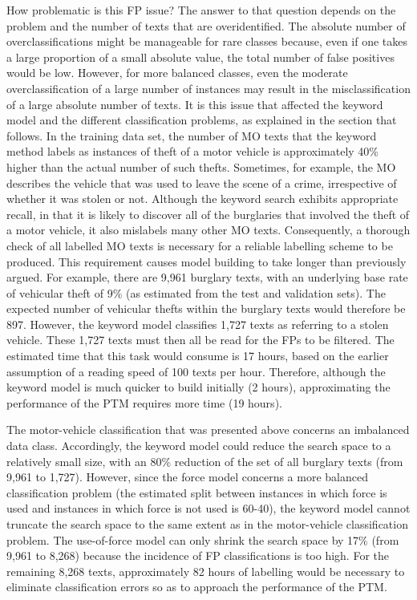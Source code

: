 How problematic is this FP issue? The answer to that question depends on the problem and the number of texts that are overidentified. The absolute number of overclassifications might be manageable for rare classes because, even if one takes a large proportion of a small absolute value, the total number of false positives would be low. However, for more balanced classes, even the moderate overclassification of a large number of instances may result in the misclassification of a large absolute number of texts. It is this issue that affected the keyword model and the different classification problems, as explained in the section that follows.
In the training data set, the number of MO texts that the keyword method labels as instances of theft of a motor vehicle is approximately 40\% higher than the actual number of such thefts. Sometimes, for example, the MO describes the vehicle that was used to leave the scene of a crime, irrespective of whether it was stolen or not. Although the keyword search exhibits appropriate recall, in that it is likely to discover all of the burglaries that involved the theft of a motor vehicle, it also mislabels many other MO texts. Consequently, a thorough check of all labelled MO texts is necessary for a reliable labelling scheme to be produced. This requirement causes model building to take longer than previously argued. For example, there are 9,961 burglary texts, with an underlying base rate of vehicular theft of 9\% (as estimated from the test and validation sets). The expected number of vehicular thefts within the burglary texts would therefore be 897. However, the keyword model classifies 1,727 texts as referring to a stolen vehicle. These 1,727 texts must then all be read for the FPs to be filtered. The estimated time that this task would consume is 17 hours, based on the earlier assumption of a reading speed of 100 texts per hour. Therefore, although the keyword model is much quicker to build initially (2 hours), approximating the performance of the PTM requires more time (19 hours).

The motor-vehicle classification that was presented above concerns an imbalanced data class. Accordingly, the keyword model could reduce the search space to a relatively small size, with an 80\% reduction of the set of all burglary texts (from 9,961 to 1,727). However, since the force model concerns a more balanced classification problem (the estimated split between instances in which force is used and instances in which force is not used is 60-40), the keyword model cannot truncate the search space to the same extent as in the motor-vehicle classification problem. The use-of-force model can only shrink the search space by 17\% (from 9,961 to 8,268) because the incidence of FP classifications is too high. For the remaining 8,268 texts, approximately 82 hours of labelling would be necessary to eliminate classification errors so as to approach the performance of the PTM.

